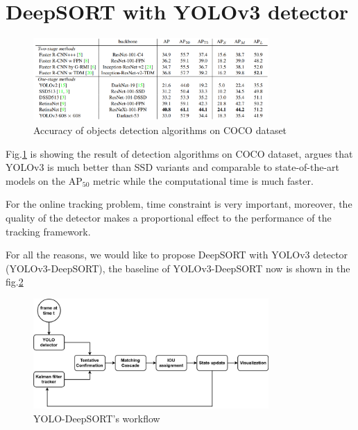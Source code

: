 \pagebreak
\section{DeepSORT with YOLOv3 detector}

\begin{figure}[h!]
    \centering
    \includegraphics[width=0.8\textwidth]{Chapters/Fig/yolov3_acc_com.png}
    \caption{Accuracy of objects detection algorithms on COCO dataset}
    \label{fig:yolov3_acc_com}
\end{figure}
Fig.\ref{fig:yolov3_acc_com} \cite{yolov3} is showing the result of detection algorithms on COCO dataset,
\cite{yolov3} argues that YOLOv3 is much better than SSD variants and comparable to state-of-the-art
models on the $\text{AP}_{50}$ metric while the computational time is much faster.\par
For the online tracking problem, time constraint is very important, moreover, the quality of the detector makes a proportional effect to the performance of the tracking framework.\par
For all the reasons, we would like to propose DeepSORT with YOLOv3 detector (YOLOv3-DeepSORT), the baseline of YOLOv3-DeepSORT now is shown in the fig.\ref{fig:yolo_deepsort} 
\begin{figure}[h!]
    \centering
    \includegraphics[width=0.8\textwidth]{Chapters/Fig/Thesis_diagram-yolo_deepsort.png}
    \caption{YOLO-DeepSORT's workflow}
    \label{fig:yolo_deepsort}
\end{figure}
